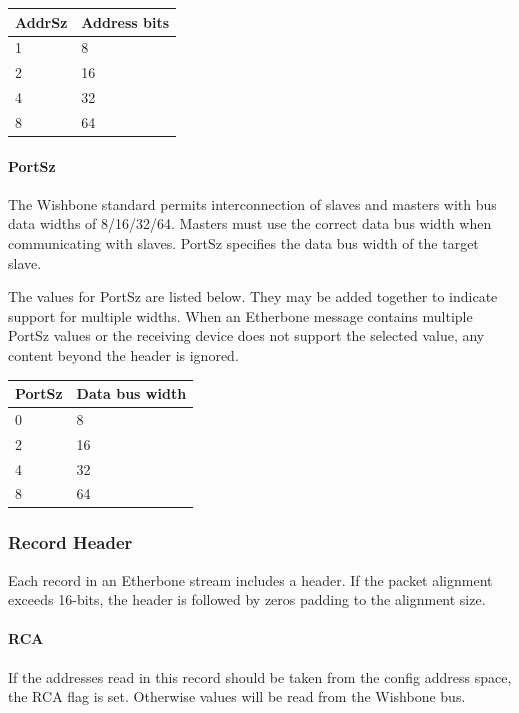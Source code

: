 \documentclass{article}
\begin{document}
\vspace{1em}
\begin{tabular}{|l|l|}
\hline
AddrSz & Address bits \\
\hline
1 & 8 \\
2 & 16 \\
4 & 32 \\
8 & 64 \\
\hline
\end{tabular}

\paragraph{PortSz} \label{field:PortSz}
The Wishbone standard permits interconnection of slaves and masters 
with bus data widths of 8/16/32/64.
Masters must use the correct data bus width when communicating with slaves.
PortSz specifies the data bus width of the target slave.

The values for PortSz are listed below.
They may be added together to indicate support for multiple widths.
When an Etherbone message contains multiple PortSz values
or the receiving device does not support the selected value, 
any content beyond the header is ignored.

\vspace{1em}
\begin{tabular}{|l|l|}
\hline
PortSz & Data bus width \\
\hline
0 & 8 \\
2 & 16 \\
4 & 32 \\
8 & 64 \\
\hline
\end{tabular}

\subsubsection{Record Header}

Each record in an Etherbone stream includes a header.
If the packet alignment exceeds 16-bits, 
the header is followed by zeros padding to the alignment size.

\paragraph{RCA} \label{field:RCA}
If the addresses read in this record should be taken from the config
address space, the RCA flag is set.
Otherwise values will be read from the Wishbone bus.
\end{document}
